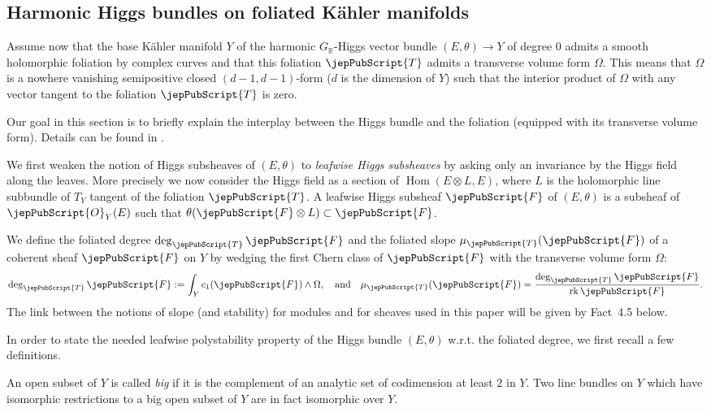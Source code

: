 \subsection{Harmonic Higgs bundles on foliated Kähler manifolds}
Assume now that the base Kähler manifold $Y$ of the harmonic $G_{\mathbb R}$-Higgs vector bundle $(E,\theta)\to Y$ of degree $0$ admits a smooth holomorphic foliation by complex curves and that this foliation $\jepPubScript{T}$ admits a transverse volume form $\Omega$. This means that $\Omega$ is a nowhere vanishing semipositive closed $(d-1,d-1)$-form ($d$ is the dimension of $Y$) such that the interior product of $\Omega$ with any vector tangent to the foliation $\jepPubScript{T}$ is zero.

Our goal in this section is to briefly explain the interplay between the Higgs bundle and the foliation (equipped with its transverse volume form). Details can be found in \cite[\S2.2]{jep93KM17}.

We first weaken the notion of Higgs subsheaves of $(E,\theta)$ to \emph{leafwise Higgs subsheaves} by asking only an invariance by the Higgs field along the leaves. More precisely we now consider the Higgs field as a section of $\operatorname{Hom}(E\otimes L,E)$, where $L$ is the holomorphic line subbundle of $T_Y$ tangent of the foliation $\jepPubScript{T}$. A leafwise Higgs subsheaf $\jepPubScript{F}$ of $(E,\theta)$ is a subsheaf of $\jepPubScript{O}_Y(E)$ such that $\theta(\jepPubScript{F}\otimes L)\subset\jepPubScript{F}$.

We define the foliated degree $\deg_{\jepPubScript{T}}\jepPubScript{F}$ and the foliated slope $\mu_{\jepPubScript{T}}(\jepPubScript{F})$ of a coherent sheaf $\jepPubScript{F}$ on $Y$ by wedging the first Chern class of $\jepPubScript{F}$ with the transverse volume form $\Omega$:
\[
\deg_{\jepPubScript{T}}\jepPubScript{F}:=\int_Y c_1(\jepPubScript{F})\wedge\Omega,\quad\text{and}\quad\mu_{\jepPubScript{T}}(\jepPubScript{F})=\frac{\deg_{\jepPubScript{T}}\jepPubScript{F}}{\operatorname{rk}\jepPubScript{F}}.
\]
The link between the notions of slope (and stability) for modules and for sheaves used in this paper will be given by Fact~4.5 below.

In order to state the needed leafwise polystability property of the Higgs bundle $(E,\theta)$ w.r.t. the foliated degree, we first recall a few definitions.

An open subset of $Y$ is called \emph{big} if it is the complement of an analytic set of codimension at least $2$ in $Y$. Two line bundles on $Y$ which have isomorphic restrictions to a big open subset of $Y$ are in fact isomorphic over $Y$.

